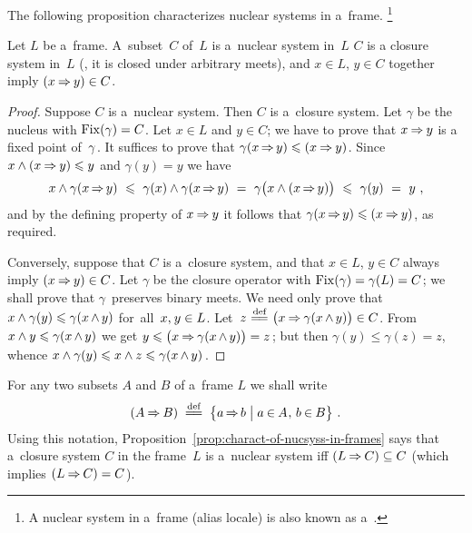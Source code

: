 \documentclass[11pt,letterpaper]{article}
\renewcommand{\thmskip}{\bigskip}
\renewcommand{\interskip}{\medskip}
\begin{document}
\txtskip

The following proposition characterizes nuclear systems in a~frame.%
%
\footnote{A nuclear system in a~frame (alias locale) is also known as a~.}
%

\thmskip

\begin{proposition}\label{prop:charact-of-nucsyss-in-frames}
Let\/ $L$ be a~frame.
A~subset\/~$C$ of\/~$L$ is a~nuclear system in\/~$L$
\iff\/ $C$ is a closure system in\/~$L$
	{\rm(}\ie, it is closed under arbitrary meets{\rm)},
and\/ $x\in L$, $y\in C$ together imply\/ $(x\mathbin{\Rightarrow} y)\in C$.
\end{proposition}

\interskip

\begin{proof}
Suppose $C$ is a~nuclear system.
Then $C$ is a~closure system.
Let $\gamma$ be the nucleus with $\mathop{\smash{\mathrm{Fix}}}\nolimits(\gamma)=C$.
Let $x\in L$ and $y\in C$;
we have to prove that $x\mathbin{\Rightarrow} y$ is a fixed point of~$\gamma\mspace{1mu}$.
It suffices to prove that $\gamma(x\mspace{-1mu}\mathbin{\Rightarrow}\mspace{-1mu} y)\leqslant(x\mathbin{\Rightarrow} y)\mspace{1mu}$.
Since $x\wedge(x\mathbin{\Rightarrow} y) \leqslant y$ and $\gamma(y)=y$ we have
%
\begin{equation*}
x\wedge\gamma(x\mspace{-1mu}\mathbin{\Rightarrow}\mspace{-1mu} y)
	\mspace{2mu}\:\leqslant\:\mspace{2mu} \gamma(x)\wedge\gamma(x\mspace{-1mu}\mathbin{\Rightarrow}\mspace{-1mu} y)
	\mspace{2mu}\:=\:\mspace{2mu} \gamma\bigl(x\wedge(x\mspace{-1mu}\mathbin{\Rightarrow}\mspace{-1mu} y)\bigr)
	\mspace{2mu}\:\leqslant\:\mspace{2mu} \gamma(y)
	\mspace{2mu}\:=\:\mspace{2mu} y~,
\end{equation*}
%
and by the defining property of $x\mathbin{\Rightarrow} y$ it follows that
	$\gamma(x\mspace{-1mu}\mathbin{\Rightarrow}\mspace{-1mu} y)\leqslant(x\mathbin{\Rightarrow} y)$,
as required.

Conversely, suppose that $C$ is a~closure system,
and that $x\in L$, $y\in C$ always imply $(x\mathbin{\Rightarrow} y)\in C$.
Let $\gamma$ be the closure operator with $\mathop{\smash{\mathrm{Fix}}}\nolimits(\gamma)=\gamma(L)=C\mspace{1mu}$;
we shall prove that $\gamma$~preserves binary meets.
We need only prove that $x\wedge\gamma(y)\leqslant\gamma(x\mspace{-1mu}\wedge\mspace{-1mu} y)$
	for~all~$x,\mspace{1mu} y\in L\mspace{1mu}$.
Let~$z\mathrel{\overset{\text{def}}{\mspace{1mu}=\!=\mspace{1mu}}}\bigl(x\mathbin{\Rightarrow}\gamma(x\mspace{-1mu}\wedge\mspace{-1mu} y)\bigr) \in C$.
From $x\wedge y\leqslant\gamma(x\mspace{-1mu}\wedge\mspace{-1mu} y)$ 
	we get $y\leqslant \bigl(x\mathbin{\Rightarrow}\gamma(x\mspace{-1mu}\wedge\mspace{-1mu} y)\bigr) = z\mspace{2mu}$;
but then $\gamma(y)\leq\gamma(z)=z$,
whence $x\wedge\gamma(y)\leqslant x\wedge z \leqslant\gamma(x\mspace{-1mu}\wedge\mspace{-1mu} y)\mspace{2mu}$.
\end{proof}

\thmskip

For any two subsets $A$ and $B$ of a~frame $L$ we shall write
%
\begin{equation*}
(A\mathbin{\Rightarrow} B) \:\mathrel{\overset{\text{def}}{\mspace{1mu}=\!=\mspace{1mu}}}\: \bigl\{ a\mspace{-1mu}\mathbin{\Rightarrow}\mspace{-1mu} b\bigm| a\mspace{-1mu}\in\mspace{-1mu} A\mspace{1mu},\, b\mspace{-1mu}\in\mspace{-1mu} B \bigr\}~.
\end{equation*}
%
Using this notation, Proposition~\ref{prop:charact-of-nucsyss-in-frames} says
    that a~closure system $C$ in the frame~$L$ is a~nuclear system iff $(L\mathbin{\Rightarrow} C)\subseteq C$
	{\large(}which implies $(L\mathbin{\Rightarrow} C)=C\mspace{1mu}${\large)}.
\end{document}

